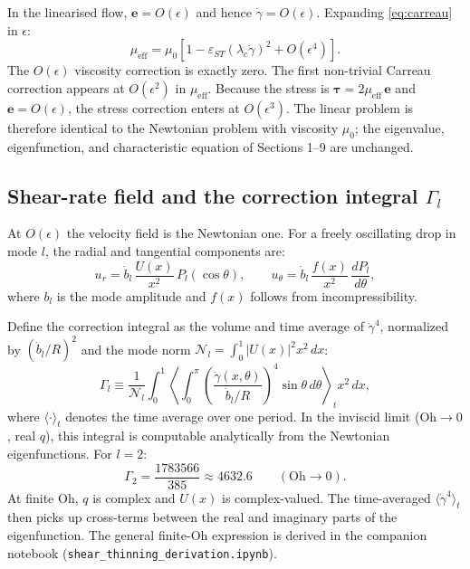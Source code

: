 In the linearised flow, $\mathbf{e} = O(\epsilon)$ and hence
$\dot\gamma = O(\epsilon)$. Expanding \eqref{eq:carreau} in $\epsilon$:
\begin{equation}
  \mu_{\mathrm{eff}}
  = \mu_0\left[1 - \varepsilon_{ST}(\lambda_c\dot\gamma)^2 + O(\epsilon^4)\right].
  \label{eq:carreau_expand}
\end{equation}
The $O(\epsilon)$ viscosity correction is exactly zero. The first non-trivial
Carreau correction appears at $O(\epsilon^2)$ in $\mu_{\mathrm{eff}}$. Because
the stress is $\boldsymbol\tau = 2\mu_{\mathrm{eff}}\,\mathbf{e}$ and
$\mathbf{e} = O(\epsilon)$, the stress correction enters at $O(\epsilon^3)$.
The linear problem is therefore identical to the Newtonian problem with
viscosity $\mu_0$; the eigenvalue, eigenfunction, and characteristic equation
of Sections 1--9 are unchanged.

\subsection{Shear-rate field and the correction integral $\Gamma_l$}

At $O(\epsilon)$ the velocity field is the Newtonian one. For a freely
oscillating drop in mode $l$, the radial and tangential components are:
\begin{equation}
  u_r = \dot{b}_l\,\frac{U(x)}{x^2}\,P_l(\cos\theta),
  \qquad
  u_\theta = \dot{b}_l\,\frac{f(x)}{x^2}\,\frac{dP_l}{d\theta},
  \label{eq:vel_carreau}
\end{equation}
where $b_l$ is the mode amplitude and $f(x)$ follows from incompressibility.

Define the correction integral as the volume and time average of
$\dot\gamma^4$, normalized by $(\dot{b}_l/R)^2$ and the mode norm
$\mathcal{N}_l = \int_0^1 |U(x)|^2 x^2\,dx$:
\begin{equation}
  \Gamma_l \equiv
  \frac{1}{\mathcal{N}_l}
  \int_0^1
  \left\langle\int_0^\pi \left(\frac{\dot\gamma(x,\theta)}{\dot{b}_l/R}\right)^4
  \sin\theta\,d\theta\right\rangle_t
  x^2\,dx,
  \label{eq:Gamma_def}
\end{equation}
where $\langle\cdot\rangle_t$ denotes the time average over one period. In the
inviscid limit ($\mathrm{Oh}\to 0$, real $q$), this integral is computable
analytically from the Newtonian eigenfunctions. For $l=2$:
\begin{equation}
  \Gamma_2 = \frac{1783566}{385} \approx 4632.6
  \qquad (\mathrm{Oh}\to 0).
  \label{eq:Gamma2}
\end{equation}
At finite $\mathrm{Oh}$, $q$ is complex and $U(x)$ is complex-valued. The
time-averaged $\langle\dot\gamma^4\rangle_t$ then picks up cross-terms between
the real and imaginary parts of the eigenfunction. The general finite-$\mathrm{Oh}$
expression is derived in the companion notebook
(\texttt{shear\_thinning\_derivation.ipynb}).


